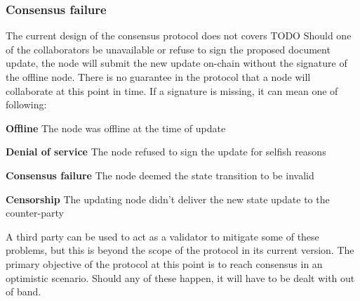 \subsubsection{Consensus failure}
The current design of the consensus protocol  does not covers TODO
Should one of the collaborators be unavailable or refuse to sign the proposed document update, the node will submit the new update on-chain without the signature of the offline node. There is no guarantee in the protocol that a node will collaborate at this point in time. If a signature is missing, it can mean one of following:
\begin{description}
    \item{\textbf{Offline}} The node was offline at the time of update
    \item{\textbf{Denial of service}} The node refused to sign the update for selfish reasons
    \item{\textbf{Consensus failure}} The node deemed the state transition to be invalid
    \item{\textbf{Censorship}} The updating node didn't deliver the new state update to the counter-party
\end{description}
A third party can be used to act as a validator to mitigate some of these problems, but this is beyond the scope of the protocol in its current version. The primary objective of the protocol at this point is to reach consensus in an optimistic scenario. Should any of these happen, it will have to be dealt with out of band.